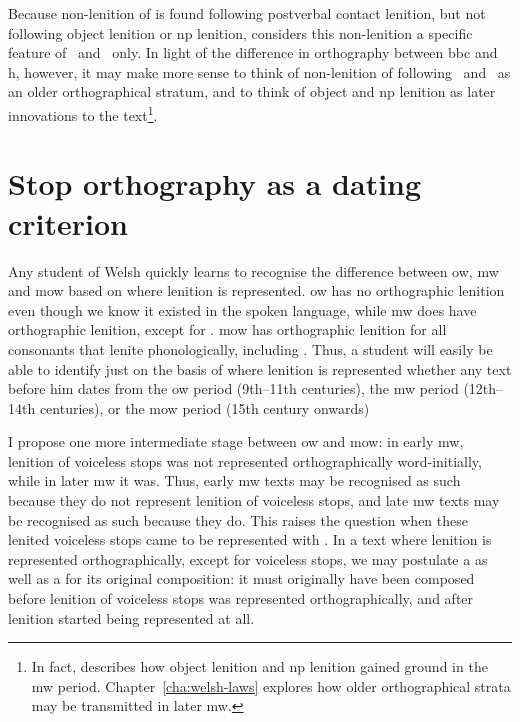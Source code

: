 Because non-lenition of  is found following postverbal contact lenition, but not following object lenition or \gls{np} lenition, \textcite{van_development14} considers this non-lenition a specific feature of \ei\ and \oes\ only. In light of the difference in orthography between \gls{bbc} and \gls{h}, however, it may make more sense to think of non-lenition of  following \ei\ and \oes\ as an older orthographical stratum, and to think of object and \gls{np} lenition as later innovations to the text\footnote{In fact, \textcite{van_development14} describes how object lenition and \gls{np} lenition gained ground in the \gls{mw} period. Chapter~\ref{cha:welsh-laws} explores how older orthographical strata may be transmitted in later \gls{mw}.}.

\section{Stop orthography as a dating criterion}
\label{sec:lenit-voic-stops-1}
Any student of Welsh quickly learns to recognise the difference between \gls{ow}, \gls{mw} and \gls{mow} based on where lenition is represented. \Gls{ow} has no orthographic lenition even though we know it existed in the spoken language, while \gls{mw} does have orthographic lenition, except for . \Gls{mow} has orthographic lenition for all consonants that lenite phonologically, including . Thus, a student will easily be able to identify just on the basis of where lenition is represented whether any text before him dates from the \gls{ow} period (9th--11th centuries), the \gls{mw} period (12th--14th centuries), or the \gls{mow} period (15th century onwards)

I propose one more intermediate stage between \gls{ow} and \gls{mow}: in early \gls{mw}, lenition of voiceless stops was not represented orthographically word-initially, while in later \gls{mw} it was. Thus, early \gls{mw} texts may be recognised as such because they do not represent lenition of voiceless stops, and late \gls{mw} texts may be recognised as such because they do. This raises the question when these lenited voiceless stops came to be represented with . In a text where  lenition is represented orthographically, except for voiceless stops, we may postulate a  as well as a  for its original composition: it must originally have been composed before lenition of voiceless stops was represented orthographically, and after lenition started being represented at all.


